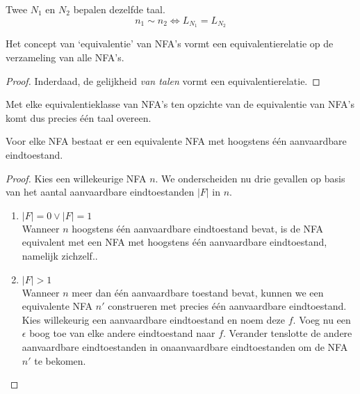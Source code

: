 \documentclass[main.tex]{subfiles}
\begin{document}
\begin{de}
  Twee  $N_{1}$ en $N_{2}$ bepalen dezelfde taal.
  \[ n_{1} \sim n_{2} \Leftrightarrow L_{N_{1}} = L_{N_{2}} \]
\end{de}

\begin{st}
  \label{st:equivalentierelatie-NFA}
  Het concept van `equivalentie' van NFA's vormt een equivalentierelatie op de verzameling van alle NFA's.

  \begin{proof}
    Inderdaad, de gelijkheid \textit{van talen} vormt een equivalentierelatie.
  \end{proof}
\end{st}

\begin{opm}
  Met elke equivalentieklasse van NFA's ten opzichte van de equivalentie van NFA's komt dus precies \'e\'en taal overeen.
\end{opm}

\begin{st}
  \label{st:hoogstens-een-eindtoestand-NFA}
  Voor elke NFA bestaat er een equivalente NFA met hoogstens \'e\'en aanvaardbare eindtoestand.

  \begin{proof}
    Kies een willekeurige NFA $n$.
    We onderscheiden nu drie gevallen op basis van het aantal aanvaardbare eindtoestanden $|F|$ in $n$.
    \begin{enumerate}
    \item $|F| = 0 \vee |F| = 1$\\
      Wanneer $n$ hoogstens \'e\'en aanvaardbare eindtoestand bevat, is de NFA equivalent met een NFA met hoogstens \'e\'en aanvaardbare eindtoestand, namelijk zichzelf..
    \item $|F| > 1$\\
      Wanneer $n$ meer dan \'e\'en aanvaardbare toestand bevat, kunnen we een equivalente NFA $n'$ construeren met precies \'e\'en aanvaardbare eindtoestand.
      Kies willekeurig een aanvaardbare eindtoestand en noem deze $f$. 
      Voeg nu een $\epsilon$ boog toe van elke andere eindtoestand naar $f$.
      Verander tenslotte de andere aanvaardbare eindtoestanden in onaanvaardbare eindtoestanden om de NFA $n'$ te bekomen.
    \end{enumerate}
  \end{proof}
\end{st}
\end{document}
